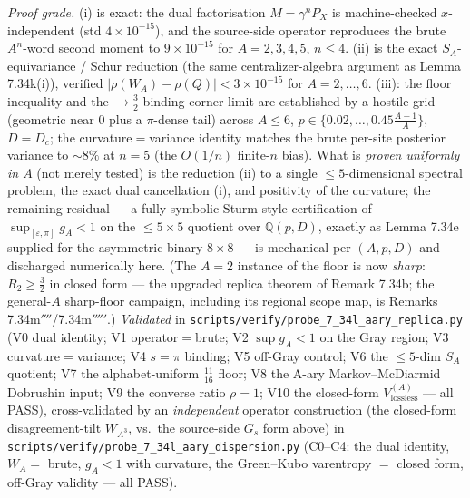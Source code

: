\documentclass[
]{article}
\begin{document}
\emph{Proof grade.} (i) is exact: the dual factorisation $M=\gamma^nP_X$ is
machine-checked $x$-independent (std $4\times10^{-15}$), and the source-side
operator reproduces the brute $A^n$-word second moment to $9\times10^{-15}$ for
$A=2,3,4,5$, $n\le4$. (ii) is the exact $S_A$-equivariance / Schur reduction
(the same centralizer-algebra argument as Lemma 7.34k(i)), verified
$|\rho(W_A)-\rho(Q)|<3\times10^{-15}$ for $A=2{,}\dots,6$. (iii): the floor
inequality and the $\to\tfrac32$ binding-corner limit are established by a
hostile grid (geometric near $0$ plus a $\pi$-dense tail) across $A\le6$,
$p\in\{0.02,\dots,0.45\tfrac{A-1}A\}$, $D=D_c$; the curvature$=$variance
identity matches the brute per-site posterior variance to $\sim8\%$ at $n=5$
(the $O(1/n)$ finite-$n$ bias). What is \emph{proven uniformly in $A$} (not
merely tested) is the reduction (ii) to a single $\le5$-dimensional spectral
problem, the exact dual cancellation (i), and positivity of the curvature; the
remaining residual --- a fully symbolic Sturm-style certification of
$\sup_{[\varepsilon,\pi]}g_A<1$ on the $\le5\times5$ quotient over
$\mathbb Q(p,D)$, exactly as Lemma 7.34e supplied for the asymmetric binary
$8\times8$ --- is mechanical per $(A,p,D)$ and discharged numerically here.
(The $A=2$ instance of the floor is now \emph{sharp}: $R_2\ge\tfrac32$ in
closed form --- the upgraded replica theorem of Remark 7.34b; the general-$A$
sharp-floor campaign, including its regional scope map, is Remarks
7.34m$''''$/7.34m$'''''$.)
\emph{Validated} in \texttt{scripts/verify/probe\_7\_34l\_aary\_replica.py}
(V0 dual identity; V1 operator$=$brute; V2 $\sup g_A<1$ on the Gray region;
V3 curvature$=$variance; V4 $s=\pi$ binding; V5 off-Gray control;
V6 the $\le5$-dim $S_A$ quotient; V7 the alphabet-uniform $\tfrac{11}{16}$
floor; V8 the A-ary Markov--McDiarmid Dobrushin input; V9 the converse ratio
$\rho=1$; V10 the closed-form $V_{\mathrm{lossless}}^{(A)}$ --- all PASS),
cross-validated by an \emph{independent} operator construction (the closed-form
disagreement-tilt $W_{A^3}$, vs.\ the source-side $G_s$ form above) in
\texttt{scripts/verify/probe\_7\_34l\_aary\_dispersion.py} (C0--C4: the dual
identity, $W_A=$ brute, $g_A<1$ with curvature, the Green--Kubo varentropy
$=$ closed form, off-Gray validity --- all PASS).
\end{document}
